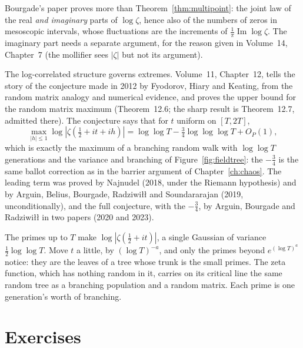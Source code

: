 \begin{remark}\label{rem:bourgade}
Bourgade's paper proves more than Theorem~\ref{thm:multipoint}: the joint law of the real \emph{and imaginary} parts of $\log\zeta$, hence also of the numbers of zeros in mesoscopic intervals, whose fluctuations are the increments of $\frac1\pi\operatorname{Im}\log\zeta$. The imaginary part needs a separate argument, for the reason given in Volume~14, Chapter~7 (the mollifier sees $|\zeta|$ but not its argument).
\end{remark}

\begin{remark}\label{rem:fhk}
The log-correlated structure governs extremes. Volume~11, Chapter~12, tells the story of the conjecture made in 2012 by Fyodorov, Hiary and Keating, from the random matrix analogy and numerical evidence, and proves the upper bound for the random matrix maximum (Theorem~12.6; the sharp result is Theorem~12.7, admitted there). The conjecture says that for $t$ uniform on $[T,2T]$,
\[
\max_{|h|\le1}\log|\zeta(\tfrac12+it+ih)|=\log\log T-\tfrac34\log\log\log T+O_P(1),
\]
which is exactly the maximum of a branching random walk with $\log\log T$ generations and the variance and branching of Figure~\ref{fig:fieldtree}: the $-\frac34$ is the same ballot correction as in the barrier argument of Chapter~\ref{ch:chaos}. The leading term was proved by Najnudel (2018, under the Riemann hypothesis) and by Arguin, Belius, Bourgade, Radziwi\l\l{} and Soundararajan (2019, unconditionally), and the full conjecture, with the $-\frac34$, by Arguin, Bourgade and Radziwi\l\l{} in two papers (2020 and 2023).
\end{remark}

\begin{beauty}
The primes up to $T$ make $\log|\zeta(\frac12+it)|$, a single Gaussian of variance $\frac12\log\log T$. Move $t$ a little, by $(\log T)^{-a}$, and only the primes beyond $e^{(\log T)^a}$ notice: they are the leaves of a tree whose trunk is the small primes. The zeta function, which has nothing random in it, carries on its critical line the same random tree as a branching population and a random matrix. Each prime is one generation's worth of branching.
\end{beauty}

\section{Exercises}

